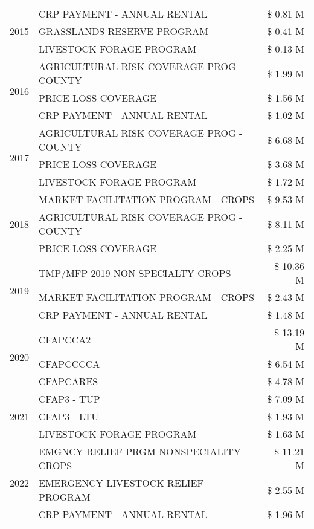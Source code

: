 \begin{tabular}{llr}
\cline{1-3}
\multirow[t]{3}{*}{2015} & CRP PAYMENT - ANNUAL RENTAL & \$ 0.81 M \\
 & GRASSLANDS RESERVE PROGRAM & \$ 0.41 M \\
 & LIVESTOCK FORAGE PROGRAM & \$ 0.13 M \\
\cline{1-3}
\multirow[t]{3}{*}{2016} & AGRICULTURAL RISK COVERAGE PROG - COUNTY & \$ 1.99 M \\
 & PRICE LOSS COVERAGE & \$ 1.56 M \\
 & CRP PAYMENT - ANNUAL RENTAL & \$ 1.02 M \\
\cline{1-3}
\multirow[t]{3}{*}{2017} & AGRICULTURAL RISK COVERAGE PROG - COUNTY & \$ 6.68 M \\
 & PRICE LOSS COVERAGE & \$ 3.68 M \\
 & LIVESTOCK FORAGE PROGRAM & \$ 1.72 M \\
\cline{1-3}
\multirow[t]{3}{*}{2018} & MARKET FACILITATION PROGRAM - CROPS & \$ 9.53 M \\
 & AGRICULTURAL RISK COVERAGE PROG - COUNTY & \$ 8.11 M \\
 & PRICE LOSS COVERAGE & \$ 2.25 M \\
\cline{1-3}
\multirow[t]{3}{*}{2019} & TMP/MFP 2019 NON SPECIALTY CROPS & \$ 10.36 M \\
 & MARKET FACILITATION PROGRAM - CROPS & \$ 2.43 M \\
 & CRP PAYMENT - ANNUAL RENTAL & \$ 1.48 M \\
\cline{1-3}
\multirow[t]{3}{*}{2020} & CFAPCCA2 & \$ 13.19 M \\
 & CFAPCCCCA & \$ 6.54 M \\
 & CFAPCARES & \$ 4.78 M \\
\cline{1-3}
\multirow[t]{3}{*}{2021} & CFAP3 - TUP & \$ 7.09 M \\
 & CFAP3 - LTU & \$ 1.93 M \\
 & LIVESTOCK FORAGE PROGRAM & \$ 1.63 M \\
\cline{1-3}
\multirow[t]{3}{*}{2022} & EMGNCY RELIEF PRGM-NONSPECIALITY CROPS & \$ 11.21 M \\
 & EMERGENCY LIVESTOCK RELIEF PROGRAM & \$ 2.55 M \\
 & CRP PAYMENT - ANNUAL RENTAL & \$ 1.96 M \\
\cline{1-3}
\bottomrule
\end{tabular}
